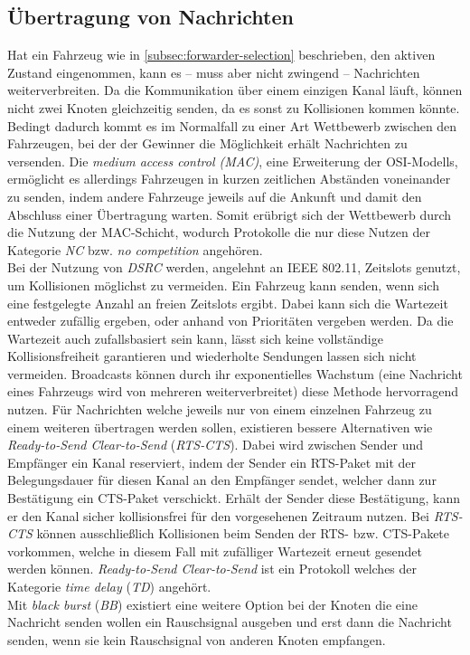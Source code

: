 \documentclass[english,runningheads,a4paper]{llncs}[2018/03/10]
\begin{document}
\subsection{Übertragung von Nachrichten}
Hat ein Fahrzeug wie in \ref{subsec:forwarder-selection} beschrieben, den aktiven Zustand eingenommen, kann es – muss aber nicht zwingend – Nachrichten weiterverbreiten.
Da die Kommunikation über einem einzigen Kanal läuft, können nicht zwei Knoten gleichzeitig senden, da es sonst zu Kollisionen kommen könnte.
Bedingt dadurch kommt es im Normalfall zu einer Art Wettbewerb zwischen den Fahrzeugen, bei der der Gewinner die Möglichkeit erhält Nachrichten zu versenden.
Die \textit{medium access control (MAC)}, eine Erweiterung der OSI-Modells, ermöglicht es allerdings Fahrzeugen in kurzen zeitlichen Abständen voneinander zu senden, indem andere Fahrzeuge jeweils auf die Ankunft und damit den Abschluss einer Übertragung warten.
Somit erübrigt sich der Wettbewerb durch die Nutzung der MAC-Schicht, wodurch Protokolle die nur diese Nutzen der Kategorie \textit{NC} bzw. \textit{no competition} angehören.\\
Bei der Nutzung von \textit{DSRC} werden, angelehnt an IEEE 802.11, Zeitslots genutzt, um Kollisionen möglichst zu vermeiden.
Ein Fahrzeug kann senden, wenn sich eine festgelegte Anzahl an freien Zeitslots ergibt.
Dabei kann sich die Wartezeit entweder zufällig ergeben, oder anhand von Prioritäten vergeben werden.
Da die Wartezeit auch zufallsbasiert sein kann, lässt sich keine vollständige Kollisionsfreiheit garantieren und wiederholte Sendungen lassen sich nicht vermeiden.
Broadcasts können durch ihr exponentielles Wachstum (eine Nachricht eines Fahrzeugs wird von mehreren weiterverbreitet) diese Methode hervorragend nutzen.
Für Nachrichten welche jeweils nur von einem einzelnen Fahrzeug zu einem weiteren übertragen werden sollen, existieren bessere Alternativen wie \textit{Ready-to-Send Clear-to-Send} (\textit{RTS-CTS}).
Dabei wird zwischen Sender und Empfänger ein Kanal reserviert, indem der Sender ein RTS-Paket mit der Belegungsdauer für diesen Kanal an den Empfänger sendet, welcher dann zur Bestätigung ein CTS-Paket verschickt.
Erhält der Sender diese Bestätigung, kann er den Kanal sicher kollisionsfrei für den vorgesehenen Zeitraum nutzen.
Bei \textit{RTS-CTS} können ausschließlich Kollisionen beim Senden der RTS- bzw. CTS-Pakete vorkommen, welche in diesem Fall mit zufälliger Wartezeit erneut gesendet werden können.
\textit{Ready-to-Send Clear-to-Send} ist ein Protokoll welches der Kategorie \textit{time delay} (\textit{TD}) angehört.\\
Mit \textit{black burst} (\textit{BB}) existiert eine weitere Option bei der Knoten die eine Nachricht senden wollen ein Rauschsignal ausgeben und erst dann die Nachricht senden, wenn sie kein Rauschsignal von anderen Knoten empfangen\cite{conti2013mobile}.
\end{document}
